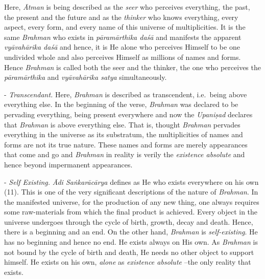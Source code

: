Here, \emph{Ātman} is being described as the \emph{seer} who perceives everything, the past, the present and the future and as the \emph{thinker} who knows everything, every aspect, every form, and every name of this universe of multiplicities. It is the same \emph{Brahman} who exists in \emph{pāramārthika daśā} and manifests the apparent \emph{vyāvahārika daśā} and hence, it is He alone who perceives Himself to be one undivided whole and also perceives Himself as millions of names and forms. Hence \emph{Brahman} is called both the seer and the thinker, the one who perceives the \emph{pāramārthika} and \emph{vyāvahārika satya} simultaneously.

- \emph{Transcendant.} Here, \emph{Brahman} is described as transcendent, i.e.\ being above everything else. In the beginning of the verse, \emph{Brahman} was declared to be pervading everything, being present everywhere and now the \emph{Upaniṣad} declares that \emph{Brahman} is above everything else. That is, thought \emph{Brahman} pervades everything in the universe as its substratum, the multiplicities of names and forms are not its true nature. These names and forms are merely appearances that come and go and \emph{Brahman} in reality is verily the \emph{existence absolute} and hence beyond impermanent appearances.

- \emph{Self Existing.} \emph{Ādi Saṅkarācārya} defines  as He who exists everywhere on his own (11). This is one of the very significant descriptions of the nature of \emph{Brahman}. In the manifested universe, for the production of any new thing, one always requires some raw-materials from which the final product is achieved. Every object in the universe undergoes through the cycle of birth, growth, decay and death. Hence, there is a beginning and an end. On the other hand, \emph{Brahman} is \emph{self-existing}. He has no beginning and hence no end. He exists always on His own. As \emph{Brahman} is not bound by the cycle of birth and death, He needs no other object to support himself. He exists on his own, \emph{alone} as \emph{existence absolute} --the only reality that exists.

